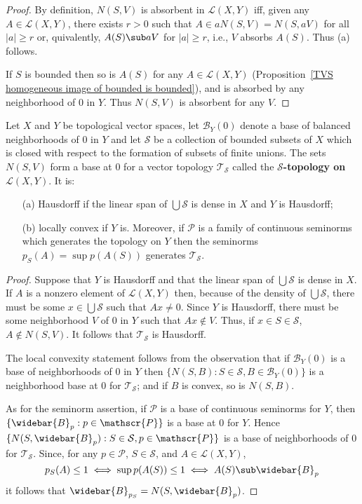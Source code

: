 \begin{proof}
By definition, $N(S,V)$ is absorbent in $\mathcal{L}(X,Y)$ iff, given any $A\in\mathcal{L}(X,Y)$, there exists $r>0$ such that $A\in aN(S,V)=N(S,aV)$ for all $|a|\geq r$ or, quivalently, $A(S)\sub aV$ for $|a|\geq r$, i.e., $V$ absorbs $A(S)$. Thus (a) follows.\par
If $S$ is bounded then so is $A(S)$ for any $A\in\mathcal{L}(X,Y)$ (Proposition~\ref{TVS homogeneous image of bounded is bounded}), and is absorbed by any neighborhood of $0$ in $Y$. Thus $N(S,V)$ is absorbent for any $V$.
\end{proof}
\begin{theorem}\label{S-topo on L(X,Y) prop}
Let $X$ and $Y$ be topological vector spaces, let $\mathcal{B}_Y(0)$ denote a base of balanced neighborhoods of $0$ in $Y$ and let $\mathcal{S}$ be a collection of bounded subsets of $X$ which is closed with respect to the formation of subsets of finite unions. The sets $N(S,V)$ form a base at $0$ for a vector topology $\mathcal{T}_\mathcal{S}$ called the \textbf{$\mathcal{S}$-topology on $\mathcal{L}(X,Y)$}. It is:
\begin{itemize}
\item[(a)] Hausdorff if the linear span of $\bigcup\mathcal{S}$ is dense in $X$ and $Y$ is Hausdorff;
\item[(b)] locally convex if $Y$ is. Moreover, if $\mathscr{P}$ is a family of continuous seminorms which generates the topology on $Y$ then the seminorms $p_S(A)=\sup p(A(S))$ generates $\mathcal{T}_\mathcal{S}$. 
\end{itemize}
\end{theorem}
\begin{proof}
Suppose that $Y$ is Hausdorff and that the linear span of $\bigcup\mathcal{S}$ is dense in $X$. If $A$ is a nonzero element of $\mathcal{L}(X,Y)$ then, because of the density of $\bigcup\mathcal{S}$, there must be some $x\in\bigcup\mathcal{S}$ such that $Ax\neq 0$. Since $Y$ is Hausdorff, there must be some neighborhood $V$ of $0$ in $Y$ such that $Ax\notin V$. Thus, if $x\in S\in\mathcal{S}$, $A\notin N(S,V)$. It follows that $\mathcal{T}_\mathcal{S}$ is Hausdorff.\par
The local convexity statement follows from the observation that if $\mathcal{B}_Y(0)$ is a base of neighborhoods of $0$ in $Y$ then $\{N(S,B):S\in\mathcal{S},B\in\mathcal{B}_Y(0)\}$ is a neighborhood base at $0$ for $\mathcal{T}_\mathcal{S}$; and if $B$ is convex, so is $N(S,B)$.\par
As for the seminorm assertion, if $\mathscr{P}$ is a base of continuous seminorms for $Y$, then $\{\widebar{B}_p:p\in\mathscr{P}\}$ is a base at $0$ for $Y$. Hence $\{N(S,\widebar{B}_p):S\in\mathcal{S},p\in\mathscr{P}\}$ is a base of neighborhoods of $0$ for $\mathcal{T}_\mathcal{S}$. Since, for any $p\in\mathscr{P}$, $S\in\mathcal{S}$, and $A\in\mathcal{L}(X,Y)$,
\[p_S(A)\leq 1\iff \sup p(A(S))\leq 1\iff A(S)\sub\widebar{B}_p\]
it follows that $\widebar{B}_{p_S}=N(S,\widebar{B}_p)$.
\end{proof}
